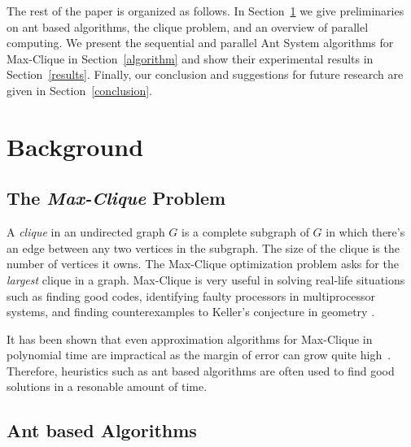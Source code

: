\documentclass[11pt]{article}
\begin{document}
The rest of the paper is organized as follows. In Section~\ref{background} we give preliminaries on ant based algorithms, the clique problem, and an overview of parallel computing.  We present the sequential and parallel Ant System algorithms for Max-Clique in Section~\ref{algorithm} and show their experimental results in Section~\ref{results}.  Finally, our conclusion and suggestions for future research are given in Section~\ref{conclusion}.


\section{Background}\label{background} 
\subsection{The \textit{Max-Clique} Problem}

A \textit{clique} in an undirected graph $G$ is a complete subgraph of $G$ in which there's an edge between any two vertices in the subgraph.  The size of the clique is the number of vertices it owns. The  Max-Clique optimization problem asks for the \textit{largest} clique in a graph.  Max-Clique is very useful in solving real-life situations such as finding good codes, identifying faulty processors in multiprocessor systems, and finding counterexamples to Keller's conjecture in geometry \cite{BP2}\cite{Sloane}\cite{SMW}\cite{Keller}\cite{LS}.

It has been shown that even approximation algorithms for Max-Clique in polynomial time are impractical as the margin of error can grow quite high~\cite{Hastad}. Therefore, heuristics such as ant based algorithms are often used to find good solutions in a resonable amount of time.




\subsection{Ant based Algorithms}\label{max_clique} 
\end{document}
